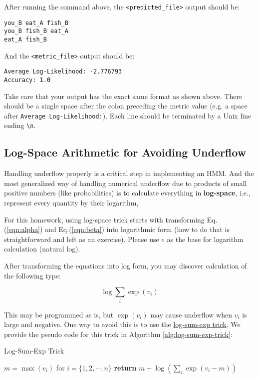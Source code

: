 \documentclass[11pt,addpoints,answers]{exam}
\begin{document}
After running the command above, the \texttt{<predicted\_file>} output should be:

\begin{lstlisting}
you_B eat_A fish_B
you_B fish_B eat_A
eat_A fish_B
\end{lstlisting}

And the \texttt{<metric\_file>} output should be:

\begin{lstlisting}
Average Log-Likelihood: -2.776793
Accuracy: 1.0
\end{lstlisting}

Take care that your output has the exact same format as shown above. There should be a single space after the colon preceding the metric value (e.g. a space after \lstinline{Average Log-Likelihood:}). Each line should be terminated by a Unix line ending \lstinline{\n}.



\subsection{Log-Space Arithmetic for Avoiding Underflow}
\label{sec:underflow}

Handling underflow properly is a critical step in implementing an HMM. And the most generalized way of handling numerical underflow due to products of small positive numbers (like probabilities) is to calculate everything in \textbf{log-space}, i.e., represent every quantity by their logarithm, 

For this homework, using log-space trick starts with transforming Eq.(\ref{eqn:alpha}) and Eq.(\ref{eqn:beta}) into logarithmic form (how to do that is straightforward and left as an exercise). Please use $e$ as the base for logarithm calculation (natural log).

After transforming the equations into log form, you may discover calculation of the following type:

$$ \log \sum_i \exp{(v_i)}$$

This may be programmed as is, but $\exp{(v_i)}$ may cause underflow when $v_i$ is large and negative. One way to avoid this is to use the \href{https://www.xarg.org/2016/06/the-log-sum-exp-trick-in-machine-learning/}{log-sum-exp trick}. We provide the pseudo code for this trick in Algorithm \ref{alg:log-sum-exp-trick}:


\begin{algorithm}[H]
    \caption{Log-Sum-Exp Trick}
    \label{alg:log-sum-exp-trick}
    \begin{algorithmic}[1]
            \State $m = \max(v_i)$ for $i=\{1, 2,\cdots, n\}$ 
            \State \textbf{return }{$m + \log(\sum_i\exp(v_i-m))$} 
        \EndProcedure
    \end{algorithmic}
\end{algorithm}
\clearpage
    
\end{document}
